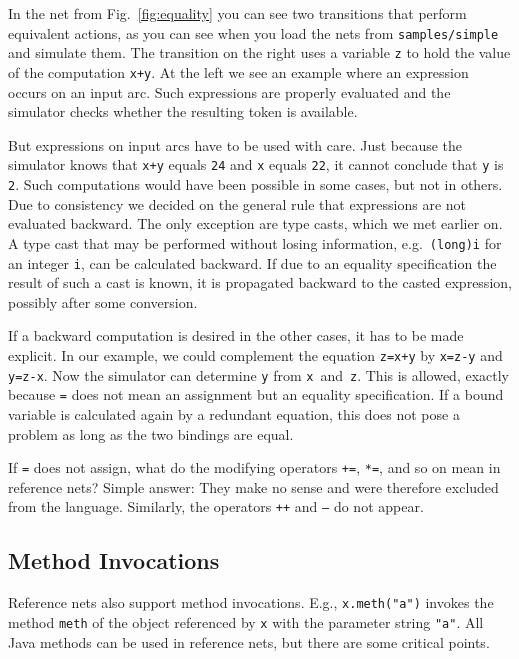 In the net from Fig.~\ref{fig:equality} you can see two transitions
that perform equivalent actions, as you can see when you
load the nets from \texttt{samples/simple} and simulate them. The
transition on the right uses a variable \texttt{z} to hold the value of the
computation \texttt{x+y}. At the left we see an example where an expression
occurs on an input arc. Such expressions are properly evaluated
and the simulator checks whether the resulting token is available.

But expressions on input arcs have to be used with care.
Just because the simulator knows that \texttt{x+y} equals \texttt{24}
and \texttt{x} equals \texttt{22}, it cannot conclude that
\texttt{y} is \texttt{2}. Such computations would have been
possible in some cases, but not in others. Due to consistency
we decided on the general rule that expressions are not evaluated
backward. The only exception are type casts, which we met earlier on.
A type cast that may be performed without losing information,
e.g.\ \texttt{(long)i} for an integer \texttt{i},
can be calculated backward.
If due to an equality specification the result of such a cast
is known, it is propagated backward to the casted expression,
possibly after some conversion.

If a backward computation is desired in the other cases,
it has to be made explicit. In our example, we could
complement the equation \texttt{z=x+y} by \texttt{x=z-y}
and \texttt{y=z-x}. Now the simulator can determine \texttt{y} from
\texttt{x}~and~\texttt{z}. This is allowed, exactly because
\texttt{=} does not mean an assignment but an equality specification.
If a bound variable is calculated again by a redundant
equation, this does not pose a
problem as long as the two bindings are equal.

If \texttt{=} does not assign,
what do the modifying operators \texttt{+=},
\texttt{*=}, and so on mean in reference nets? Simple answer: They
make no sense and were therefore excluded from the language.
Similarly, the operators \texttt{++} and \texttt{--} do not
appear.

\subsection{Method Invocations}

Reference nets also support method invocations.
E.g., \texttt{x.meth("a")} invokes the method \texttt{meth} of the
object referenced by \texttt{x} with the parameter string \texttt{"a"}.
All Java methods can be used in reference nets, but there are
some critical points.

